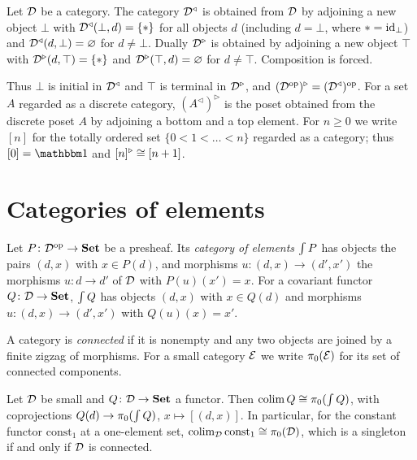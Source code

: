 \begin{definition}\label{def:adjoin}
Let $\mathcal{D}$ be a category. The category $\mathcal{D}^{\triangleleft}$ is obtained from
$\mathcal{D}$ by adjoining a new object $\bot$ with
$\mathcal{D}^{\triangleleft}(\bot,d)=\{*\}$ for all objects $d$ (including
$d=\bot$, where $*=\mathrm{id}_\bot$) and $\mathcal{D}^{\triangleleft}(d,\bot)=\varnothing$
for $d\neq\bot$. Dually $\mathcal{D}^{\triangleright}$ is obtained by adjoining a new
object $\top$ with $\mathcal{D}^{\triangleright}(d,\top)=\{*\}$ and
$\mathcal{D}^{\triangleright}(\top,d)=\varnothing$ for $d\neq\top$. Composition is
forced.
\end{definition}

Thus $\bot$ is initial in $\mathcal{D}^{\triangleleft}$ and $\top$ is terminal in
$\mathcal{D}^{\triangleright}$, and $(\mathcal{D}^{\mathrm{op}})^{\triangleright}=(\mathcal{D}^{\triangleleft})^{\mathrm{op}}$.
For a set $A$ regarded as a discrete category, $(A^{\triangleleft})^{\triangleright}$
is the poset obtained from the discrete poset $A$ by adjoining a bottom and a
top element. For $n\geq 0$ we write $[n]$ for the totally ordered set
$\{0<1<\dots<n\}$ regarded as a category; thus $[0]=\one$ and
$[n]^{\triangleright}\cong[n+1]$.

\section{Categories of elements}\label{sec:elements}

\begin{definition}\label{def:elements}
Let $P\colon\mathcal{D}^{\mathrm{op}}\to\mathbf{Set}$ be a presheaf. Its \emph{category of elements}
$\textstyle\int P$ has objects the pairs $(d,x)$ with $x\in P(d)$, and morphisms
$u\colon(d,x)\to(d',x')$ the morphisms $u\colon d\to d'$ of $\mathcal{D}$ with
$P(u)(x')=x$. For a covariant functor $Q\colon\mathcal{D}\to\mathbf{Set}$, $\textstyle\int Q$ has objects
$(d,x)$ with $x\in Q(d)$ and morphisms $u\colon(d,x)\to(d',x')$ with
$Q(u)(x)=x'$.
\end{definition}

A category is \emph{connected} if it is nonempty and any two objects are
joined by a finite zigzag of morphisms. For a small category $\mathcal{E}$ we write
$\pi_0(\mathcal{E})$ for its set of connected components.

\begin{lemma}\label{lem:colim-set}
Let $\mathcal{D}$ be small and $Q\colon\mathcal{D}\to\mathbf{Set}$ a functor. Then $\operatorname*{colim} Q\cong\pi_0(\textstyle\int Q)$,
with coprojections $Q(d)\to\pi_0(\textstyle\int Q)$, $x\mapsto[(d,x)]$. In particular,
for the constant functor $\mathrm{const}_1$ at a one-element set, $\operatorname*{colim}_{\mathcal{D}}\mathrm{const}_1\cong\pi_0(\mathcal{D})$,
which is a singleton if and only if $\mathcal{D}$ is connected.
\end{lemma}

